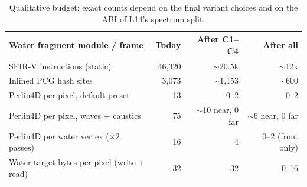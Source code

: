 \documentclass[11pt,a4paper]{article}
\begin{document}
\begin{table}[h]
\centering
\small
\begin{tabular}{@{}lrrr@{}}
\toprule
\textbf{Water fragment module / frame} & \textbf{Today} & \textbf{After C1--C4} & \textbf{After all} \\
\midrule
SPIR-V instructions (static) & 46,320 & $\sim$20.5k & $\sim$12k \\
Inlined PCG hash sites & 3,073 & $\sim$1,153 & $\sim$600 \\
Perlin4D per pixel, default preset & 13 & 0--2 & 0--2 \\
Perlin4D per pixel, waves $+$ caustics & 75 & $\sim$10 near, 0 far & $\sim$6 near, 0 far \\
Perlin4D per water vertex ($\times 2$ passes) & 16 & 4 & 0--2 (front only) \\
Water target bytes per pixel (write $+$ read) & 32 & 32 & 0--16 \\
\bottomrule
\end{tabular}
\caption{Qualitative budget; exact counts depend on the final variant choices and on the ABI of L14's spectrum split.}
\end{table}
\end{document}
